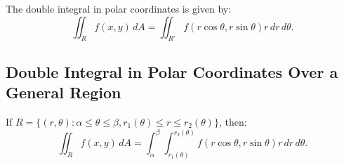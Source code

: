 \documentclass[a4paper,11pt]{article}
\begin{document}
\begin{tcolorbox}
    The double integral in polar coordinates is given by:
    \[
    \iint_R f(x,y) \, dA = \iint_{R'} f(r \cos{\theta},r \sin{\theta}) r \, dr \, d\theta.
    \]
\end{tcolorbox}




\subsection{Double Integral in Polar Coordinates Over a General Region}

\begin{tcolorbox}
    If $R = \{ (r,\theta) : \alpha \leq \theta \leq \beta, r_1(\theta) \leq r \leq r_2(\theta) \}$, then:
    \[
    \iint_R f(x,y) \, dA = \int_{\alpha}^{\beta} \int_{r_1(\theta)}^{r_2(\theta)} f(r \cos{\theta}, r \sin{\theta}) r \, dr \, d\theta.
    \]
\end{tcolorbox}
\end{document}
